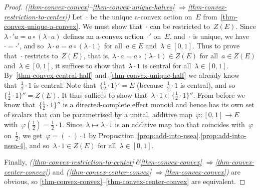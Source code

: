 \documentclass[a4paper, onecolumn, accepted=2020-12-22]{quantumarticle}
\newcommand{\mult}{\mathop{\circ}}
\theoremstyle{definition}
\begin{document}
\begin{proof}
\emph{(\ref{thm-convex-convex}--\ref{thm-convex-unique-halves}%
$\Rightarrow$\ref{thm-convex-restriction-to-center})}
Let~$\cdot$ be the unique a-convex action on~$E$ 
from~\ref{thm-convex-unique-a-convex}.
We must show that~$\cdot$ can be restricted to~$Z(E)$.
Since $\lambda\cdot'a=a \mult(\lambda \cdot a)$ defines
an a-convex action~$\cdot'$ 
on~$E$, and~$\cdot$ is unique, we have $\cdot=\cdot'$,
and so~$\lambda\cdot a = a\mult(\lambda\cdot 1)$
for all~$a\in E$ and~$\lambda\in [0,1]$.
Thus to prove that~$\cdot$ restricts to~$Z(E)$,
that is, $\lambda\cdot a= a\mult (\lambda \cdot 1 )\in Z(E)$
for all~$a\in Z(E)$ and~$\lambda\in [0,1]$,
it suffices to show that~$\lambda\cdot 1$ is central
for all~$\lambda\in [0,1]$.
By~\ref{thm-convex-central-half} and~\ref{thm-convex-unique-half}
we already know that~$\frac{1}{2}\cdot 1$ is central.
Note that~$\{\frac{1}{2}\cdot 1\}'=E$
 (because~$\frac12\cdot 1$ is central), and
so~$\{\frac{1}{2}\cdot 1\}''=Z(E)$.
It thus suffices to show that~$\lambda\cdot 1 \in \{\frac12\cdot 1\}''$.
From before we know that~$\{\frac12\cdot 1\}''$
is a directed-complete effect monoid and hence has its own set
of scalars that can be parametrised by a unital, additive
map~$\varphi\colon [0,1]\to E$ with~$\varphi(\frac12)=\frac12\cdot 1$.
Since~$\lambda\mapsto \lambda\cdot 1$ is an additive map too
that coincides with~$\varphi$ on~$\frac12$,
we get~$\varphi=(\,\cdot\,)\cdot 1$
by Proposition~\ref{prop:add-into-nsea}.\ref{prop:add-into-nsea-4},
and so~$\lambda\cdot 1\in Z(E)$ for all~$\lambda\in [0,1]$.

Finally,
\emph{(\ref{thm-convex-restriction-to-center}\,\emph{\&}\ref{thm-convex-convex}%
$\Rightarrow$\ref{thm-convex-center-convex})} 
and 
\emph{(\ref{thm-convex-center-convex}%
$\Rightarrow$\ref{thm-convex-convex})} are obvious,
so
\ref{thm-convex-convex}--\ref{thm-convex-center-convex}
are equivalent.
\end{proof}



\end{document}
